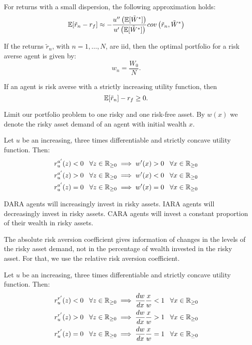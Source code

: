 \documentclass[twoside, titlepage]{article}
\begin{document}
For returns with a small dispersion, the following approximation holds:
\[
    \mathbb{E}[\tilde{r}_n - r_f] \approx - \frac{u''\left(\mathbb{E}[\tilde{W}^*]\right)}{u'\left(\mathbb{E}[\tilde{W}^*]\right)} cov\left(\tilde{r}_n, \tilde{W}^*\right)
\]


\begin{proposition}
    If the returns $\tilde{r}_n$, with $n = 1, \dots, N$, are iid, then the optimal portfolio for a risk averse agent is given by:
    \[
        w_n = \frac{W_0}{N}.
    \]
\end{proposition}

\begin{proposition}
    If an agent is risk averse with a strictly increasing utility function, then
    \[
        \mathbb{E}[\tilde{r}_n] - r_f \geq 0.
    \]
\end{proposition}

Limit our portfolio problem to one risky and one risk-free asset. By $w(x)$ we denote the risky asset demand of an agent with initial wealth $x$.

\begin{proposition}
    Let $u$ be an increasing, three times differentiable and strictly concave utility function. Then:
    \begin{align*}
        r^{a'}_u(z) < 0 \;\;\; \forall z \in \mathbb{R}_{\geq 0} & \implies w'(x) > 0 \;\;\; \forall x \in \mathbb{R}_{\geq 0} \\
        r^{a'}_u(z) > 0 \;\;\; \forall z \in \mathbb{R}_{\geq 0} & \implies w'(x) < 0 \;\;\; \forall x \in \mathbb{R}_{\geq 0} \\
        r^{a'}_u(z) = 0 \;\;\; \forall z \in \mathbb{R}_{\geq 0} & \implies w'(x) = 0 \;\;\; \forall x \in \mathbb{R}_{\geq 0}
    \end{align*}
    \begin{explanation}
        DARA agents will increasingly invest in risky assets. IARA agents will decreasingly invest in risky assets. CARA agents will invest a constant proportion of their wealth in risky assets.
    \end{explanation}
\end{proposition}

The absolute risk aversion coefficient gives information of changes in the levels of the risky asset demand, not in the percentage of wealth invested in the risky asset. For that, we use the relative risk aversion coefficient.

\begin{proposition}
    Let $u$ be an increasing, three times differentiable and strictly concave utility function. Then:
    \begin{align*}
        r^{r'}_u(z) < 0 \;\;\; \forall z \in \mathbb{R}_{\geq 0} & \implies \frac{dw}{dx}\frac{x}{w} < 1 \;\;\; \forall x \in \mathbb{R}_{\geq 0} \\
        r^{r'}_u(z) > 0 \;\;\; \forall z \in \mathbb{R}_{\geq 0} & \implies \frac{dw}{dx}\frac{x}{w} > 1 \;\;\; \forall x \in \mathbb{R}_{\geq 0} \\
        r^{r'}_u(z) = 0 \;\;\; \forall z \in \mathbb{R}_{\geq 0} & \implies \frac{dw}{dx}\frac{x}{w} = 1 \;\;\; \forall x \in \mathbb{R}_{\geq 0}
    \end{align*}
\end{proposition}
\end{document}

